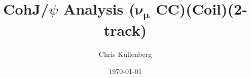 \title{CohJ/$\psi$ Analysis ($\boldsymbol{\nu_\mu}$ \textbf{CC})(\textbf{Coil})(\textbf{2-track})}
\author{Chris Kullenberg}
\date{\today}
